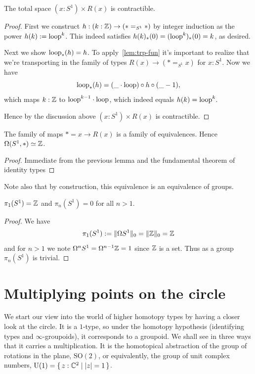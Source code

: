 \documentclass[10pt,oneside,leqno,openright]{memoir}
\begin{document}
\begin{lemma}
    The total space $(x : S^1) \times R(x)$ is contractible.
\end{lemma}
\begin{proof}
  First we construct $h : (k : \mathbb{Z}) \to (\ast =_{S^1} \ast)$
  by integer induction as the power $h(k) := \mathrm{loop}^k$.
  This indeed satisfies $h(k)_*(0) = (\mathrm{loop}^k)_*(0) = k$, as desired.

  Next we show ${\mathrm{loop}}_*(h) = h$.
  To apply~\cref{lem:trp-fun} it's important to realize that we're transporting in the family of types $R(x) \to (\ast =_{S^1} x)$ for $x:S^1$. Now we have
  \[ \mathrm{loop}_*(h) = (\_ \cdot \mathrm{loop}) \circ h \circ (\_-1),\]
  which maps $k:\mathbb{Z}$ to $\mathrm{loop}^{k-1}\cdot\mathrm{loop}$, which indeed equals $h(k)=\mathrm{loop}^k$.

  Hence by the discussion above $(x : S^1) \times R(x)$ is contractible.
\end{proof}

\begin{corollary}\label{cor:id-S1}
    The family of maps $\ast = x \to R(x)$ is a family of equivalences.
    Hence $\Omega(S^1,\ast) \simeq \mathbb{Z}$.
\end{corollary}
\begin{proof}
    Immediate from the previous lemma and the fundamental theorem of identity types
\end{proof}
Note also that by construction, this equivalence is an equivalence of groups.

\begin{corollary}
    $\pi_1(S^1) = \mathbb{Z}$ and $\pi_n(S^1) = 0$ for all $n > 1$.
\end{corollary}
\begin{proof}
    We have
    \[ \pi_1(S^1) := \lVert\Omega S^1\rVert_0 = \lVert\mathbb{Z}\rVert_0 = \mathbb{Z} \]
    and for $n > 1$ we note $\Omega^n S^1 = \Omega^{n-1} \mathbb{Z} = 1$ since $\mathbb{Z}$ is a set.
    Thus as a group $\pi_n(S^1)$ is trivial.
\end{proof}

\section{Multiplying points on the circle}

We start our view into the world of higher homotopy types by having a closer look at the circle. It is a $1$-type, so under the homotopy hypothesis (identifying types and $\infty$-groupoids), it corresponds to a groupoid. We shall see in three ways that it carries a multiplication. It is the homotopical abstraction of the group of rotations in the plane, $\mathrm{SO(2)}$, or equivalently, the group of unit complex numbers, $\mathrm{U(1)} = \{\,z:\mathbb{C}^2 \mid \lvert z\rvert=1\,\}$.
\end{document}
